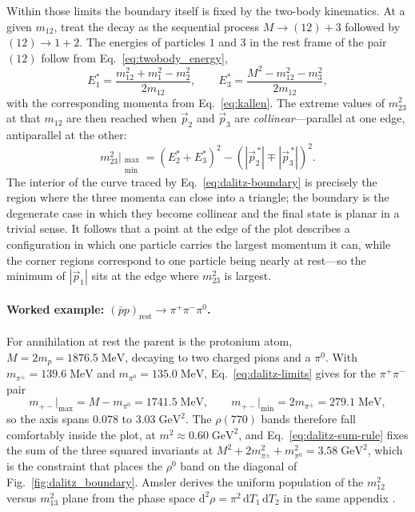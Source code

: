 Within those limits the boundary itself is fixed by the two-body kinematics. At a given
$m_{12}$, treat the decay as the sequential process $M \to (12) + 3$ followed by
$(12) \to 1 + 2$. The energies of particles $1$ and $3$ in the rest frame of the pair
$(12)$ follow from Eq.~\eqref{eq:twobody_energy},
\begin{equation}
  E_1^* = \frac{m_{12}^2 + m_1^2 - m_2^2}{2 m_{12}},
  \qquad
  E_3^* = \frac{M^2 - m_{12}^2 - m_3^2}{2 m_{12}},
  \label{eq:dalitz-star-energies}
\end{equation}
with the corresponding momenta from Eq.~\eqref{eq:kallen}. The extreme values of
$m_{23}^2$ at that $m_{12}$ are then reached when $\vec p_2$ and $\vec p_3$ are
\emph{collinear}---parallel at one edge, antiparallel at the other:
\begin{equation}
  m_{23}^2\big|_{\substack{\max\\\min}}
  = \left(E_2^* + E_3^*\right)^2
    - \left(\left|\vec p_2^{\,*}\right| \mp \left|\vec p_3^{\,*}\right|\right)^2 .
  \label{eq:dalitz-boundary}
\end{equation}
The interior of the curve traced by Eq.~\eqref{eq:dalitz-boundary} is precisely the
region where the three momenta can close into a triangle; the boundary is the degenerate
case in which they become collinear and the final state is planar in a trivial sense. It
follows that a point at the edge of the plot describes a configuration in which one
particle carries the largest momentum it can, while the corner regions correspond to one
particle being nearly at rest---so the minimum of $\left|\vec p_1\right|$ sits at the
edge where $m_{23}^2$ is largest.

\paragraph{Worked example: $(\bar p p)_{\text{rest}}\to\pi^+\pi^-\pi^0$.}
For annihilation at rest the parent is the protonium atom, $M = 2 m_p =
1876.5\;\mathrm{MeV}$, decaying to two charged pions and a $\pi^0$. With
$m_{\pi^\pm} = 139.6\;\mathrm{MeV}$ and $m_{\pi^0} = 135.0\;\mathrm{MeV}$,
Eq.~\eqref{eq:dalitz-limits} gives for the $\pi^+\pi^-$ pair
\begin{equation*}
  m_{+-}\big|_{\max} = M - m_{\pi^0} = 1741.5\;\mathrm{MeV},
  \qquad
  m_{+-}\big|_{\min} = 2 m_{\pi^\pm} = 279.1\;\mathrm{MeV},
\end{equation*}
so the axis spans $0.078$ to $3.03\;\mathrm{GeV}^2$. The $\rho(770)$ bands therefore fall
comfortably inside the plot, at $m^2 \approx 0.60\;\mathrm{GeV}^2$, and
Eq.~\eqref{eq:dalitz-sum-rule} fixes the sum of the three squared invariants at
$M^2 + 2m_{\pi^\pm}^2 + m_{\pi^0}^2 = 3.58\;\mathrm{GeV}^2$, which is the constraint
that places the $\rho^0$ band on the diagonal of Fig.~\ref{fig:dalitz_boundary}. Amsler
derives the uniform population of the $m_{12}^2$ versus $m_{13}^2$ plane from the phase
space $\mathrm{d}^2\rho = \pi^2\,\mathrm{d}T_1\,\mathrm{d}T_2$ in the same appendix
\cite[App.~B]{Amsler2018}.

